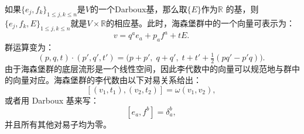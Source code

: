 如果$\{e_{j}, f_{k}\}_{1 \leq j,k \leq n}$是$V$的一个Darboux基，那么取$\{E\}$作为$\mathbb{R}$ 的基，则$\{e_{j}, f_{k}, E\}_{1 \leq j,k \leq n}$就是$V \times \mathbb{R}$的相应基。此时，海森堡群中的一个向量可表示为：
$$
v = q^{a} e_{a} + p_{a} f^{a} + tE.~
$$
群运算变为：
$$
(p, q, t) \cdot (p', q', t') = \big(p + p',\; q + q',\; t + t' + \tfrac{1}{2}(pq' - p'q)\big).~
$$
由于海森堡群的底层流形是一个线性空间，因此李代数中的向量可以规范地与群中的向量对应。海森堡群的李代数由以下对易关系给出：
$$
[(v_{1}, t_{1}), (v_{2}, t_{2})] = \omega(v_{1}, v_{2}),~
$$
或者用 Darboux 基来写：
$$
[e_{a}, f^{b}] = \delta_{a}^{b},~
$$
并且所有其他对易子均为零。
